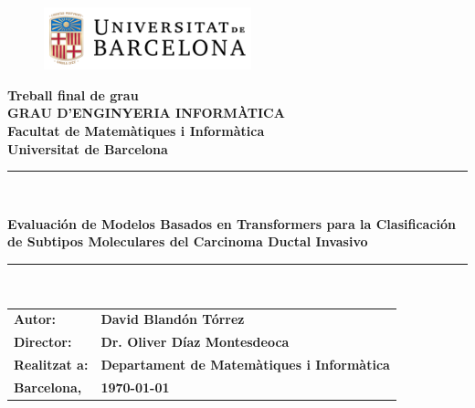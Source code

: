 \documentclass[a4paper,10pt]{book}
\begin{document}
\pagestyle{empty}
\begin{titlepage}
	\begin{center}
		\begin{figure}[htb]
			\begin{center}
				\includegraphics[width=6cm]{assets/ub_color.pdf}
			\end{center}
		\end{figure}
				
		\def\worktitle{Evaluación de Modelos Basados en Transformadores para la Clasificación de Subtipos Moleculares del Carcinoma Ductal Invasivo de Mama Mediante Mamografía}
				
		\textbf{\LARGE Treball final de grau} \\
		\vspace*{.5cm}
		\textbf{\LARGE GRAU D'ENGINYERIA INFORM\`{A}TICA } \\
		\vspace*{.5cm}
		\textbf{\LARGE Facultat de Matem\`atiques i Inform\`atica\\ Universitat de Barcelona} \\
		\vspace*{1.0cm}
		\rule{16cm}{0.1mm}\\
		\begin{Huge}
			\textbf{Evaluación de Modelos Basados en Transformers para la Clasificación de Subtipos Moleculares del Carcinoma Ductal Invasivo} \\
		\end{Huge}
		\rule{16cm}{0.1mm}\\
				
		\vspace{1cm}
				
		\begin{flushright}
						
						
			\vspace*{2.5cm}
						
			\hfill
						
			\renewcommand{\arraystretch}{1.5}
			\begin{tabular}{ll}
				\textbf{\small Autor:}       & \textbf{\small David Bland\'on T\'orrez }                             \\
				\textbf{\small Director:}    & \textbf{\small Dr. Oliver D\'iaz Montesdeoca }                        \\
				\textbf{\small Realitzat a:} & \textbf{\small  Departament de Matem\`{a}tiques i  Inform\`{a}tica  } \\
				\textbf{\small Barcelona,}   & \textbf{\small \today }                                               
			\end{tabular}
						
		\end{flushright}
				
	\end{center}
		
\end{titlepage}
\end{document}
